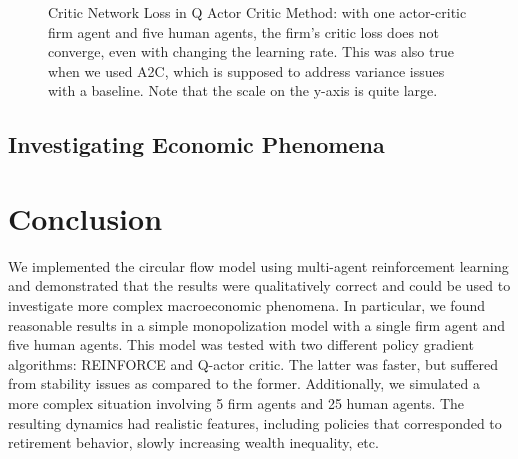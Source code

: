 \documentclass[twoside,twocolumn]{article}
\begin{document}
\begin{figure}[h]
\caption{Critic Network Loss in Q Actor Critic Method: with one actor-critic firm agent and five human agents, the firm's critic loss does not converge, even with changing the learning rate. This was also true when we used A2C, which is supposed to address variance issues with a baseline. Note that the scale on the y-axis is quite large.}
\label{plt:acadvloss}
\end{figure}




\subsection{Investigating Economic Phenomena}

\section{Conclusion}

We implemented the circular flow model using multi-agent reinforcement learning and demonstrated that the results were qualitatively correct and could be used to investigate more complex macroeconomic phenomena. In particular, we found reasonable results in a simple monopolization model with a single firm agent and five human agents. This model was tested with two different policy gradient algorithms: REINFORCE and Q-actor critic. The latter was faster, but suffered from stability issues as compared to the former. Additionally, we simulated a more complex situation involving 5 firm agents and 25 human agents. The resulting dynamics had realistic features, including policies that corresponded to retirement behavior, slowly increasing wealth inequality, etc.

\medskip 
\end{document}

